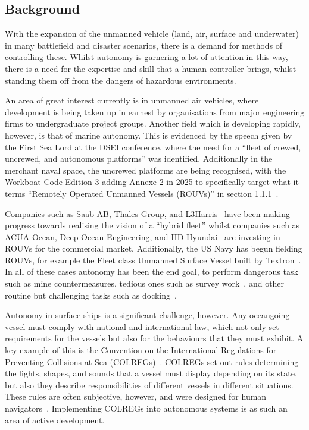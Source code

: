 \documentclass[../main.tex]{subfiles}
\begin{document}
\subsection{Background}

With the expansion of the unmanned vehicle (land, air, surface and underwater)
in many battlefield and disaster scenarios, there is a demand for methods of
controlling these. Whilst autonomy is garnering a lot of attention in this way,
there is a need for the expertise and skill that a human controller brings,
whilst standing them off from the dangers of hazardous environments.

An area of great interest currently is in unmanned air vehicles, where
development is being taken up in earnest by organisations from major engineering
firms to undergraduate project groups.
Another field which is developing rapidly, however, is that of marine autonomy.
This is evidenced by the speech given by the First Sea Lord at the DSEI conference,
where the need for a ``fleet of crewed, uncrewed, and autonomous platforms''\cite{Jenkins2025} was identified.
Additionally in the merchant naval space, the uncrewed platforms are being recognised,
with the Workboat Code Edition 3 adding Annexe 2 in 2025 to specifically target
what it terms ``Remotely Operated Unmanned Vessels (ROUVs)'' in section 1.1.1~\cite{WBC3}.

Companies such as Saab AB, Thales Group, and L3Harris~\cite{SaabAB}\cite{ThalesGroup2025}\cite{L3Harris2026} have been making progress towards realising the vision of a ``hybrid fleet'' whilst companies such as ACUA Ocean, Deep Ocean Engineering, and HD Hyundai~\cite{ACUAOcean2025}\cite{DeepOcean2025}\cite{HDHyundaiCoLtd2024} are investing in ROUVs for the commercial market.
Additionally, the US Navy has begun fielding ROUVs, for example the Fleet class Unmanned Surface Vessel built by Textron~\cite{TextronSystems2025}.
In all of these cases autonomy has been the end goal, to perform dangerous task such as mine countermeasures, tedious ones such as survey work~\cite{Manley2008}, and other routine but challenging tasks such as docking~\cite{Campbell2012}.

Autonomy in surface ships is a significant challenge, however.
Any oceangoing vessel must comply with national and international law, which not only set requirements for the vessels but also for the behaviours that they must exhibit.
A key example of this is the Convention on the International Regulations for Preventing Collisions at Sea (COLREGs)~\cite{COLREGS1972}.
COLREGs set out rules determining the lights, shapes, and sounds that a vessel must display depending on its state, but also they describe responsibilities of different vessels in different situations.
These rules are often subjective, however, and were designed for human navigators~\cite{Campbell2012}.
Implementing COLREGs into autonomous systems is as such an area of active development.
\end{document}

